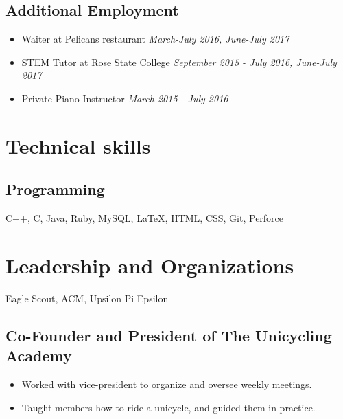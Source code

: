 \documentclass{article}
\begin{document}
\subsection{Additional Employment}
\begin{itemize}
	\itemsep0em
	\item Waiter at Pelicans restaurant \hfill\textit{March-July 2016, June-July 2017} 
	
	\item STEM Tutor at Rose State College \hfill\textit{September 2015 - July 2016, June-July 2017} 
	
	\item Private Piano Instructor \hfill\textit{March 2015 - July 2016}
\end{itemize}

\section{Technical skills}

\subsection{Programming}

C++, C, Java, Ruby, MySQL, {\LaTeX}, HTML, CSS, Git, Perforce

\section{Leadership and Organizations}
Eagle Scout, ACM, Upsilon Pi Epsilon 
\subsection{Co-Founder and President of The Unicycling Academy}
\begin{itemize}
	\itemsep0em
	\item Worked with vice-president to organize and oversee weekly meetings. 
	\item Taught members how to ride a unicycle, and guided them in practice.
\end{itemize}
\noindent
\end{document}
